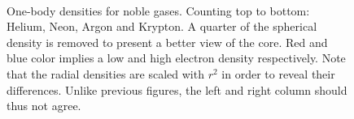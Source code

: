 \begin{figure}
\begin{center}
     \\
  \caption{One-body densities for noble gases. Counting top to bottom: Helium, Neon, Argon and Krypton. A quarter of the spherical density is removed to present a better view of the core. Red and blue color implies a low and high electron density respectively. Note that the radial densities are scaled with $r^2$ in order to reveal their differences. Unlike previous figures, the left and right column should thus not agree.}
  \label{fig:OBD_noble_Atoms_2D_combo}
 \end{center}
\end{figure}
 
 
